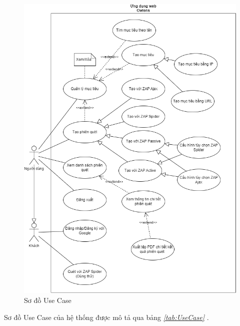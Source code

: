 \begin{figure}[H]
      \centering
      \includegraphics[width=\textwidth]{applied-thesis-chapters/chapter-3/Sơ đồ Use Case.png}
      \caption{Sơ đồ Use Case}
      \label{fig:UseCase}
\end{figure}

Sơ đồ Use Case của hệ thống được mô tả qua bảng \textit{\ref{tab:UseCase} }.

